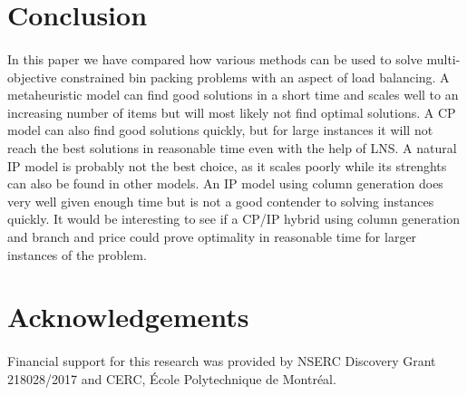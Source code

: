 \documentclass{llncs}
\begin{document}




\section{Conclusion}

\paragraph{}In this paper we have compared how various methods can be used to solve multi-objective constrained bin packing problems with an aspect of load balancing. A metaheuristic model can find good solutions in a short time and scales well to an increasing number of items but will most likely not find optimal solutions. A CP model can also find good solutions quickly, but for large instances it will not reach the best solutions in reasonable time even with the help of LNS. A natural IP model is probably not the best choice, as it scales poorly while its strenghts can also be found in other models. An IP model using column generation does very well given enough time but is not a good contender to solving instances quickly. It would be interesting to see if a CP/IP hybrid using column generation and branch and price could prove optimality in reasonable time for larger instances of the problem.

\section*{Acknowledgements}

\paragraph{}Financial support for this research was provided by NSERC Discovery Grant 218028/2017 and CERC, École Polytechnique de Montréal.

{}

\end{document}
